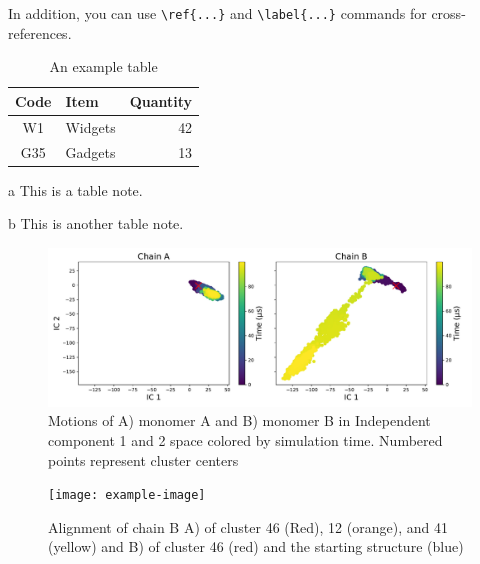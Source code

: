 \documentclass{biophys-new}
\begin{document}
In addition, you can use \verb|\ref{...}| and \verb|\label{...}| commands for cross-references.

\begin{table}[hbt!]
\caption{An example table}
\label{tab:widgets}
\centering

\begin{threeparttable}

\begin{tabular}{c l r}
\hline
Code & Item & Quantity \\\hline
W1 & Widgets\tnote{a} & 42 \\
G35 & Gadgets & 13\tnote{b} \\
\hline
\end{tabular}

\begin{tablenotes}
\item[a] This is a table note.
\item[b] This is another table note.
\end{tablenotes}

\end{threeparttable}

\end{table}

\begin{figure}[h]
\centering
\graphicspath{ {./figures/} }
\includegraphics[width=0.6\linewidth]{fig_1_fdiscolortime_ic2.pdf}
\caption{Motions of A) monomer A and B) monomer B in Independent component 1 and 2 space colored by simulation time. Numbered points represent cluster centers}
\label{fig:view}
\end{figure}

\begin{figure}[h]
\centering
\texttt{[image: example-image]}
\caption{Alignment of chain B A) of cluster 46 (Red), 12 (orange), and 41 (yellow) and B) of cluster 46 (red) and the starting structure (blue)}
\label{fig:view}
\end{figure}
\end{document}
